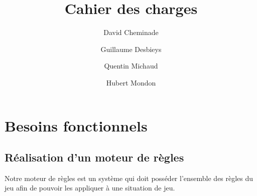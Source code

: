 \documentclass[12pt]{article}
\begin{document}
 
	\title{Cahier des charges}             
	\author{
		David Cheminade
		\and
		Guillaume Desbieys
		\and
		Quentin Michaud
		\and
		Hubert Mondon
	}                       
	\date{}
	\maketitle{}       

	\let\thefootnote\relax

	\section{Besoins fonctionnels}    

		\subsection{Réalisation d'un moteur de règles}

			Notre moteur de règles est un système qui doit posséder l'ensemble des règles du jeu afin de pouvoir les appliquer à une situation de jeu.
\end{document}
